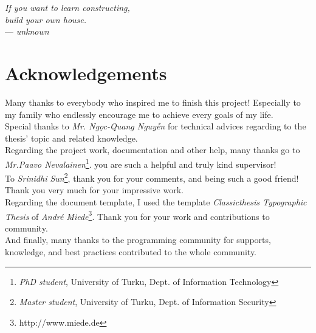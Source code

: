 

\begin{flushright}{\slshape    
If you want to learn constructing, \\
build your own house.} \\ \medskip
--- \emph{unknown}
\end{flushright}

\bigskip


\begingroup

\let\clearpage\relax
\let\cleardoublepage\relax
\let\cleardoublepage\relax

\chapter*{Acknowledgements} %

\noindent Many thanks to everybody who inspired me to finish this project! 
Especially to my family who endlessly encourage me to achieve every goals of my life.  \\

\noindent Special thanks to \emph{Mr. Ng\d{o}c-Quang Nguy\~{\^{e}}n} for technical advices regarding to the thesis' topic and related knowledge. \\

\noindent Regarding the project work, documentation and other help, many thanks go to \emph{Mr.Paavo Nevalainen}\footnote{\emph{PhD student}, University of Turku,  Dept. of Information Technology}. you are such a helpful and truly kind supervisor! \\

\noindent To \emph{Srinidhi Sun}\footnote{\emph{Master student}, University of Turku,  Dept. of Information Security}, thank you for your comments, and being such a good friend! \\

Thank you very much for your impressive work.\\

\noindent Regarding the document template, I used the \latex template \emph{Classicthesis Typographic Thesis} of \emph{Andr\'{e} Miede}\footnote{http://www.miede.de}.
Thank you for your work and contributions to \latex community.\\

\noindent And finally, many thanks to the programming community for supports, knowledge, and best practices contributed to the whole community.

\endgroup

